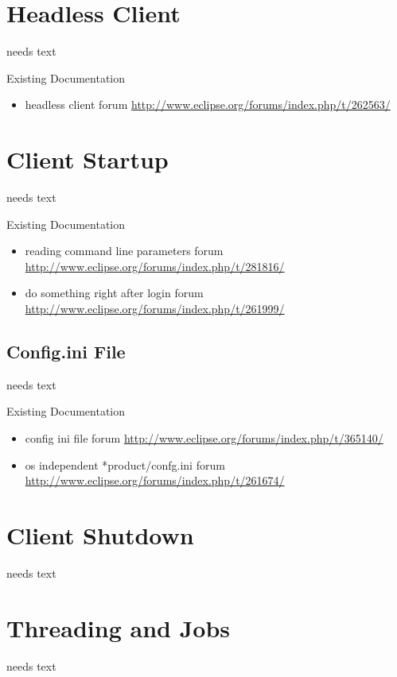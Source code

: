 \documentclass[a4paper,10pt,twoside]{book}
\begin{document}
{%
\section{Headless Client}
needs text

\noindent Existing Documentation
\begin{itemize}
  \item headless client forum \url{http://www.eclipse.org/forums/index.php/t/262563/}
\end{itemize}

\section{Client Startup}
needs text

\noindent Existing Documentation
\begin{itemize}
  \item reading command line parameters forum \url{http://www.eclipse.org/forums/index.php/t/281816/}
  \item do something right after login forum \url{http://www.eclipse.org/forums/index.php/t/261999/}
\end{itemize}

\subsection{Config.ini File}
needs text

\noindent Existing Documentation
\begin{itemize}
  \item config ini file forum \url{http://www.eclipse.org/forums/index.php/t/365140/}
  \item os independent *product/confg.ini forum \url{http://www.eclipse.org/forums/index.php/t/261674/}
\end{itemize}

\section{Client Shutdown}
needs text

\section{Threading and Jobs}
needs text

}
\end{document}
